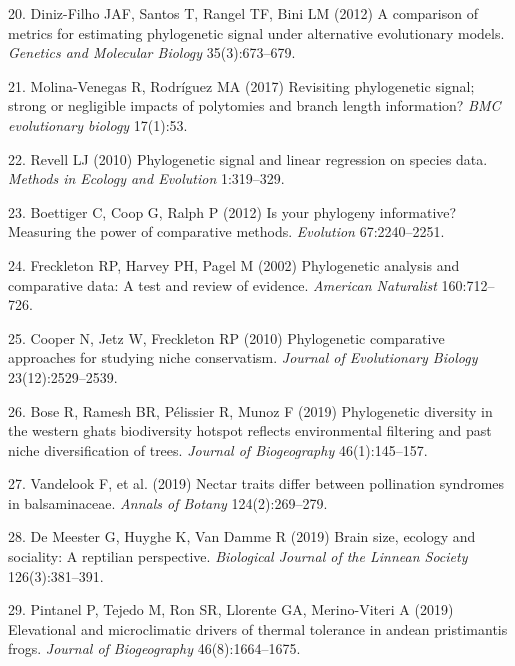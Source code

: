 \documentclass[9pt,twocolumn,twoside,lineno]{pnas-new}
\begin{document}
\leavevmode\hypertarget{ref-DinizFilho2012}{}%
20. Diniz-Filho JAF, Santos T, Rangel TF, Bini LM (2012) A comparison of
metrics for estimating phylogenetic signal under alternative
evolutionary models. \emph{Genetics and Molecular Biology}
35(3):673--679.

\leavevmode\hypertarget{ref-MolinaVenegas2017}{}%
21. Molina-Venegas R, Rodríguez MA (2017) Revisiting phylogenetic
signal; strong or negligible impacts of polytomies and branch length
information? \emph{BMC evolutionary biology} 17(1):53.

\leavevmode\hypertarget{ref-Revell2010}{}%
22. Revell LJ (2010) Phylogenetic signal and linear regression on
species data. \emph{Methods in Ecology and Evolution} 1:319--329.

\leavevmode\hypertarget{ref-Boettiger_et_al2012}{}%
23. Boettiger C, Coop G, Ralph P (2012) Is your phylogeny informative?
Measuring the power of comparative methods. \emph{Evolution}
67:2240--2251.

\leavevmode\hypertarget{ref-Freckleton_et_al2002}{}%
24. Freckleton RP, Harvey PH, Pagel M (2002) Phylogenetic analysis and
comparative data: A test and review of evidence. \emph{American
Naturalist} 160:712--726.

\leavevmode\hypertarget{ref-Cooper2010}{}%
25. Cooper N, Jetz W, Freckleton RP (2010) Phylogenetic comparative
approaches for studying niche conservatism. \emph{Journal of
Evolutionary Biology} 23(12):2529--2539.

\leavevmode\hypertarget{ref-Bose2019}{}%
26. Bose R, Ramesh BR, Pélissier R, Munoz F (2019) Phylogenetic
diversity in the western ghats biodiversity hotspot reflects
environmental filtering and past niche diversification of trees.
\emph{Journal of Biogeography} 46(1):145--157.

\leavevmode\hypertarget{ref-Vandelook2019}{}%
27. Vandelook F, et al. (2019) Nectar traits differ between pollination
syndromes in balsaminaceae. \emph{Annals of Botany} 124(2):269--279.

\leavevmode\hypertarget{ref-DeMeester2019}{}%
28. De Meester G, Huyghe K, Van Damme R (2019) Brain size, ecology and
sociality: A reptilian perspective. \emph{Biological Journal of the
Linnean Society} 126(3):381--391.

\leavevmode\hypertarget{ref-Pintanel2019}{}%
29. Pintanel P, Tejedo M, Ron SR, Llorente GA, Merino-Viteri A (2019)
Elevational and microclimatic drivers of thermal tolerance in andean
pristimantis frogs. \emph{Journal of Biogeography} 46(8):1664--1675.
\end{document}
